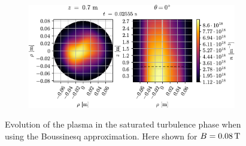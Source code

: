 {\begin{figure}[htbp]
    \begin{subfigure}[h]{1.00\textwidth}
        \centering
        \includegraphics[width=1.0\textwidth]{fig/results/compareBouss/evolution/n-perpPar-2D-2}
    \end{subfigure}
    \caption{Evolution of the plasma in the saturated turbulence phase when using the Boussinesq approximation.
        Here shown for $B=0.08\, \text{T}$}
    \label{fig:turbBEv}
\end{figure}
}
%

